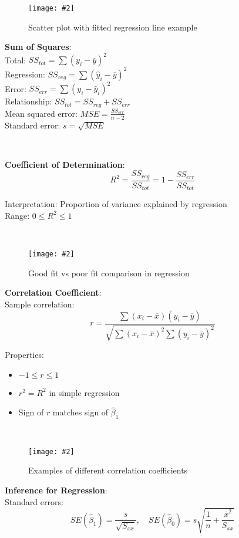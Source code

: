 \documentclass{article}
\def\imagewidth{0.9}
\newenvironment{cheatformula}[1][Title]{
    \begin{minipage}{\linewidth}
    \textbf{#1}:\\
}{
    \end{minipage}\\[2ex]
}
\newcommand{\cheatimage}[4][\imagewidth]{
    \begin{figure}[H]
        \centering
        \texttt{[image: \#2]}
        \caption{#3}
        \label{#4}
    \end{figure}
}
\begin{document}
\begin{multicols*}{2}
\cheatimage[1.0]{scatter_regression.png}{Scatter plot with fitted regression line example}{fig:scatter-regression}

\begin{cheatformula}[Sum of Squares]
    Total: $SS_{tot} = \sum(y_i - \overline{y})^2$\\
    Regression: $SS_{reg} = \sum(\hat{y}_i - \overline{y})^2$\\
    Error: $SS_{err} = \sum(y_i - \hat{y}_i)^2$\\
    
    Relationship: $SS_{tot} = SS_{reg} + SS_{err}$\\
    
    Mean squared error: $MSE = \frac{SS_{err}}{n-2}$\\
    Standard error: $s = \sqrt{MSE}$
\end{cheatformula}

\begin{cheatformula}[Coefficient of Determination]
    $$R^2 = \frac{SS_{reg}}{SS_{tot}} = 1 - \frac{SS_{err}}{SS_{tot}}$$
    
    Interpretation: Proportion of variance explained by regression\\
    Range: $0 \leq R^2 \leq 1$
\end{cheatformula}

\cheatimage[1.0]{regression_fit_comparison.png}{Good fit vs poor fit comparison in regression}{fig:regression-fit-comparison}

\begin{cheatformula}[Correlation Coefficient]
    Sample correlation:
    $$r = \frac{\sum(x_i - \overline{x})(y_i - \overline{y})}{\sqrt{\sum(x_i - \overline{x})^2\sum(y_i - \overline{y})^2}}$$
    
    Properties:
    \begin{itemize}
        \item $-1 \leq r \leq 1$
        \item $r^2 = R^2$ in simple regression
        \item Sign of $r$ matches sign of $\hat{\beta}_1$
    \end{itemize}
\end{cheatformula}

\cheatimage[1.0]{correlation_examples.png}{Examples of different correlation coefficients}{fig:correlation-examples}

\begin{cheatformula}[Inference for Regression]
    Standard errors:
    $$SE(\hat{\beta}_1) = \frac{s}{\sqrt{S_{xx}}}, \quad SE(\hat{\beta}_0) = s\sqrt{\frac{1}{n} + \frac{\overline{x}^2}{S_{xx}}}$$
    

\end{cheatformula}
\end{multicols*}
\end{document}
